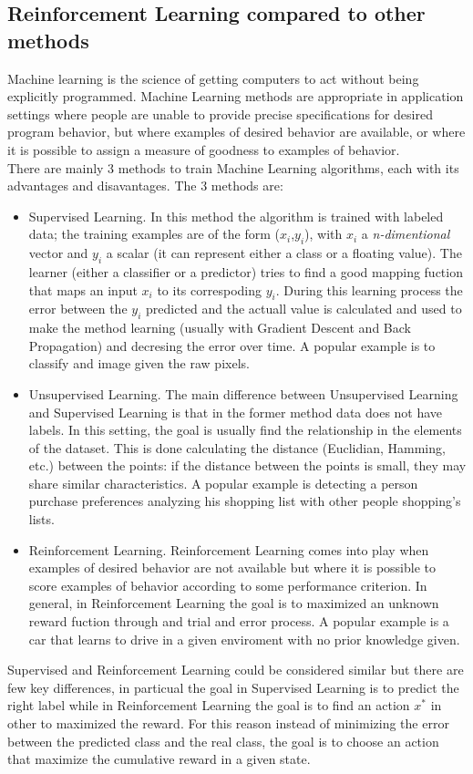 \documentclass[14pt]{extarticle}
\begin{document}
\begin{flushleft}
\subsection{Reinforcement Learning compared to other methods}
Machine learning is the science of getting computers to act without being explicitly programmed. Machine Learning methods are appropriate in application settings where
people are unable to provide precise specifications for desired program behavior, but
where examples of desired behavior are available, or where it is possible to assign a
measure of goodness to examples of behavior\cite{RLandSL}.
\\
There are mainly 3 methods to train Machine Learning algorithms, each with its advantages and disavantages. The 3 methods are:
\begin{itemize}
\item Supervised Learning. In this method the algorithm is trained with labeled data; the training examples are of the form ($x_i$,$y_i$), with $x_i$ a \emph{n-dimentional} vector and $y_i$ a scalar (it can represent either a class or a floating value). The learner (either a classifier or a predictor) tries to find a good mapping fuction that maps an input $x_i$ to its correspoding $y_i$. During this learning process the error between the $y_i$ predicted and the actuall value is calculated and used to make the method learning (usually with Gradient Descent and Back Propagation) and decresing the error over time. A popular example is to classify and image given the raw pixels.
\item Unsupervised Learning. The main difference between Unsupervised Learning and Supervised Learning is that in the former method data does not have labels. In this setting, the goal is usually find the relationship in the elements of the dataset. This is done calculating the distance (Euclidian, Hamming, etc.) between the points: if the distance between the points is small, they may share similar characteristics. A popular example is detecting a person purchase preferences analyzing his shopping list with other people shopping's lists.
\item Reinforcement Learning. Reinforcement Learning comes into play when examples of desired behavior are not available but where it is possible to score examples of behavior according to some performance criterion\cite{RLandSL}. In general, in Reinforcement Learning the goal is to maximized an unknown reward fuction through and trial and error process. A popular example is a car that learns to drive in a given enviroment with no prior knowledge given.
\end{itemize}
Supervised and Reinforcement Learning could be considered similar but there are few key differences, in particual the goal in Supervised Learning is to predict the right label while in Reinforcement Learning the goal is to find an action $x^*$ in other to maximized the reward. For this reason instead of minimizing the error between the predicted class and the real class, the goal is to choose an action that maximize the cumulative reward in a given state.


\end{flushleft}
\end{document}

